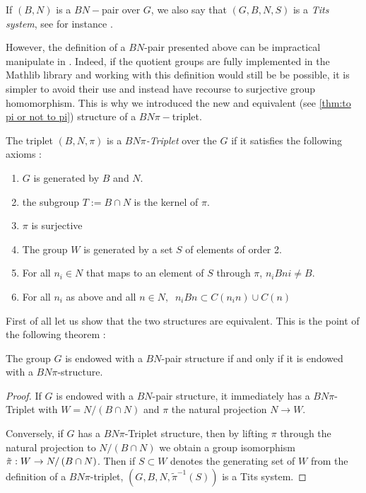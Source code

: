 \begin{notation}
    If $\left( B,N \right)$ is a $BN-$pair over $G$, we also say that $\left( G, B, N, S \right)$ is a \emph{Tits system}, see for instance \cite{bourbaki_groupes_2007}.
\end{notation}


However, the definition of a $BN$-pair presented above can be impractical manipulate in \Lean. Indeed, if the quotient groups are fully implemented in the Mathlib library and working with this definition would still be be possible, it is simpler to avoid their use and instead have recourse to surjective group homomorphism. 
    This is why we introduced the new and equivalent (see \ref{thm:to pi or not to pi}) structure of a $BN\pi-$triplet.  %

\begin{definition}[$BN\pi$-Triplet] \label{BNpi}
  The triplet $\left( B,N, \pi \right)$ is a \emph{$BN\pi$-Triplet} over the $G$ if it satisfies the following axioms :
    \begin{enumerate}
        \item $G$ is generated by $B$ and $N$.
        \item the subgroup $T := B \cap N$ is the kernel of $\pi$.
        \item $\pi$ is surjective
        \item The group $W$ is generated by a set $S$ of elements of order 2.
        \item For all $n_{i} \in N$ that maps to an element of $S$ through $\pi$, $n_{i}Bni \neq B$.
        \item For all $n_{i}$ as above and all $n \in N, \ $ $n_i B n \subset C(n_in) \cup C(n)$
    \end{enumerate}
\end{definition}


First of all let us show that the two structures are equivalent. This is the point of the following theorem :

\begin{theoreme} \label{thm:to pi or not to pi}
    The group $G$ is endowed with a $BN$-pair structure if and only if it is endowed with a $BN\pi$-structure.
\end{theoreme}

\begin{proof}
    If $G$ is endowed with a $BN$-pair structure, it immediately has a $BN\pi$-Triplet with $W = N / (B \cap N)$ and $\pi$ the natural projection $N \to W$.

    Conversely, if $G$ has a $BN\pi$-Triplet structure, then by lifting $\pi$ through the natural projection to $N / \left( B \cap N \right)$ we obtain a group isomorphism $\tilde{\pi} : W \to N / \left( B \cap N \right)$. Then if $S \subset W$ denotes the generating set of $W$ from the definition of a $BN\pi$-triplet, $\left(G, B, N, \tilde{\pi}^{-1}\left( S \right)  \right)$ is a Tits system.
\end{proof}

